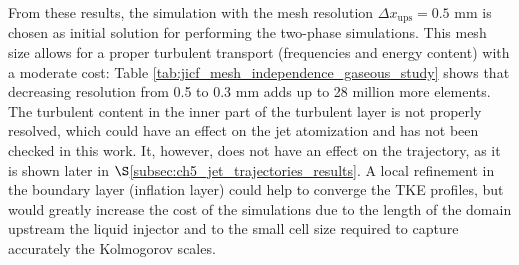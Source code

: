 From these results, the simulation with the mesh resolution $\Delta x_\mathrm{ups} = 0.5$ mm is chosen as initial solution for performing the two-phase simulations. This mesh size allows for a proper turbulent transport (frequencies and energy content) with a moderate cost: Table \ref{tab:jicf_mesh_independence_gaseous_study} shows that decreasing resolution from 0.5 to 0.3 mm adds up to 28 million more elements. The turbulent content in the inner part of the turbulent layer is not properly resolved, which could have an effect on the jet atomization and has not been checked in this work. It, however, does not have an effect on the trajectory, as it is shown later in $\S$\ref{subsec:ch5_jet_trajectories_results}. A local refinement in the boundary layer (inflation layer) could help to converge the TKE profiles, but would greatly increase the cost of the simulations due to the length of the domain upstream the liquid injector and to the small cell size required to capture accurately the Kolmogorov scales.









